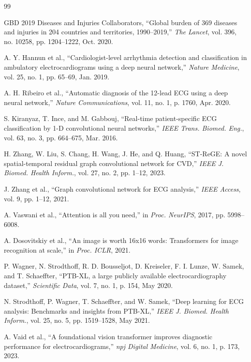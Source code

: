 \documentclass[14pt]{extarticle}
\begin{document}
\begin{thebibliography}{99}

GBD 2019 Diseases and Injuries Collaborators, ``Global burden of 369 diseases and injuries in 204 countries and territories, 1990--2019,'' \textit{The Lancet}, vol. 396, no. 10258, pp. 1204--1222, Oct. 2020.

A. Y. Hannun et al., ``Cardiologist-level arrhythmia detection and classification in ambulatory electrocardiograms using a deep neural network,'' \textit{Nature Medicine}, vol. 25, no. 1, pp. 65--69, Jan. 2019.

A. H. Ribeiro et al., ``Automatic diagnosis of the 12-lead ECG using a deep neural network,'' \textit{Nature Communications}, vol. 11, no. 1, p. 1760, Apr. 2020.

S. Kiranyaz, T. Ince, and M. Gabbouj, ``Real-time patient-specific ECG classification by 1-D convolutional neural networks,'' \textit{IEEE Trans. Biomed. Eng.}, vol. 63, no. 3, pp. 664--675, Mar. 2016.

H. Zhang, W. Liu, S. Chang, H. Wang, J. He, and Q. Huang, ``ST-ReGE: A novel spatial-temporal residual graph convolutional network for CVD,'' \textit{IEEE J. Biomed. Health Inform.}, vol. 27, no. 2, pp. 1--12, 2023.

J. Zhang et al., ``Graph convolutional network for ECG analysis,'' \textit{IEEE Access}, vol. 9, pp. 1--12, 2021.

A. Vaswani et al., ``Attention is all you need,'' in \textit{Proc. NeurIPS}, 2017, pp. 5998--6008.

A. Dosovitskiy et al., ``An image is worth 16x16 words: Transformers for image recognition at scale,'' in \textit{Proc. ICLR}, 2021.

P. Wagner, N. Strodthoff, R. D. Bousseljot, D. Kreiseler, F. I. Lunze, W. Samek, and T. Schaeffter, ``PTB-XL, a large publicly available electrocardiography dataset,'' \textit{Scientific Data}, vol. 7, no. 1, p. 154, May 2020.

N. Strodthoff, P. Wagner, T. Schaeffter, and W. Samek, ``Deep learning for ECG analysis: Benchmarks and insights from PTB-XL,'' \textit{IEEE J. Biomed. Health Inform.}, vol. 25, no. 5, pp. 1519--1528, May 2021.

A. Vaid et al., ``A foundational vision transformer improves diagnostic performance for electrocardiograms,'' \textit{npj Digital Medicine}, vol. 6, no. 1, p. 173, 2023.


\end{thebibliography}
\end{document}

